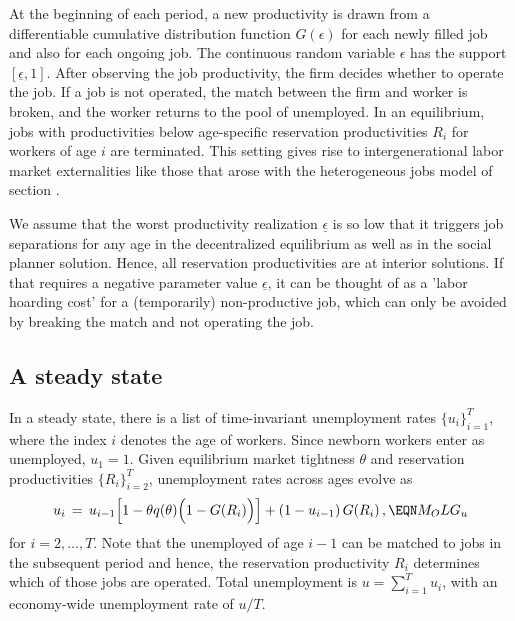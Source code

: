 At the beginning of each period, a new
productivity is drawn  from a differentiable
cumulative distribution function $G(\epsilon)$
for each newly filled job and also  for each ongoing job.
The continuous random variable $\epsilon$ has the support
$[\underline \epsilon,1]$.
After observing the job
productivity, the firm decides whether  to operate the job. If a job
is not operated, the match between the firm and worker is broken, and the
worker returns to the pool of unemployed. In an equilibrium, jobs with  productivities below
age-specific reservation productivities $R_i$ for  workers of
age $i$ are terminated. This setting gives rise to
intergenerational labor market externalities   like  those that
arose with the  heterogeneous jobs model of  section .

We assume that the worst productivity realization $\underline \epsilon$
is so low that it triggers job separations for any age in the
decentralized equilibrium as well as in the social planner solution.
Hence, all reservation productivities are at interior solutions.
If that requires a negative parameter value $\underline \epsilon$, it
can be thought of as a 'labor hoarding cost' for a (temporarily)
non-productive job, which can only be avoided by breaking the match
and not operating the job.



\subsection{A steady state}

In a steady state, there is a list of  time-invariant unemployment rates
$\{u_i\}_{i=1}^{T}$, where the index $i$ denotes the
age of workers. Since newborn workers enter as
unemployed,  $u_1=1$. Given equilibrium market tightness
$\theta$ and reservation productivities $\{R_i\}_{i=2}^{T}$,
unemployment rates across ages evolve as
$$
u_i \,=\, u_{i-1} \Bigl[1 - \theta q(\theta) \Bigl(1- G(R_i) \Bigr) \Bigr]
         + (1-u_{i-1}) \,G(R_i)\,,                             \EQN M_OLG_u
$$
for $i=2, \ldots, T$. Note that the unemployed of age $i-1$ can
be matched to jobs in the subsequent period and hence, the reservation
productivity $R_i$ determines which of those jobs are operated. Total
unemployment is $u = \sum_{i=1}^T u_i$, with an economy-wide
unemployment rate of $u/T$.

